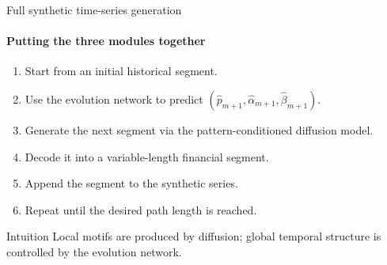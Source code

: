 \begin{frame}{Full synthetic time-series generation}
\framesubtitle{Putting the three modules together}
\begin{enumerate}\setlength\itemsep{2pt}
  \item Start from an initial historical segment.
  \item Use the evolution network to predict
        $(\hat{p}_{m+1},\hat{\alpha}_{m+1},\hat{\beta}_{m+1})$.
  \item Generate the next segment via the pattern-conditioned diffusion model.
  \item Decode it into a variable-length financial segment.
  \item Append the segment to the synthetic series.
  \item Repeat until the desired path length is reached.
\end{enumerate}

\medskip
\begin{alertblock}{Intuition}
Local motifs are produced by diffusion; global temporal structure is controlled by the evolution network.
\end{alertblock}
\end{frame}
